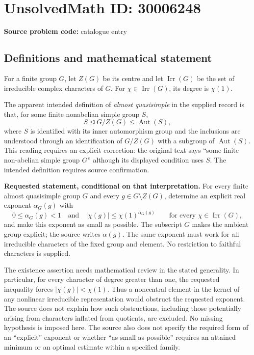 \documentclass[11pt]{article}
\begin{document}
\section*{UnsolvedMath ID: 30006248}
\textbf{Source problem code:} catalogue entry
\subsection{Definitions and mathematical statement}
For a finite group \(G\), let \(Z(G)\) be its centre and let \(\operatorname{Irr}(G)\) be the set of irreducible complex characters of \(G\). For \(\chi\in\operatorname{Irr}(G)\), its degree is \(\chi(1)\).

The apparent intended definition of \emph{almost quasisimple} in the supplied record is that, for some finite nonabelian simple group \(S\),
\[
S\trianglelefteq G/Z(G)\leq\operatorname{Aut}(S),
\]
where \(S\) is identified with its inner automorphism group and the inclusions are understood through an identification of \(G/Z(G)\) with a subgroup of \(\operatorname{Aut}(S)\). This reading requires an explicit correction: the original text says ``some finite non-abelian simple group \(G\)'' although its displayed condition uses \(S\). The intended definition requires source confirmation.

\textbf{Requested statement, conditional on that interpretation.} For every finite almost quasisimple group \(G\) and every \(g\in G\setminus Z(G)\), determine an explicit real exponent \(\alpha_G(g)\) with
\[
0\leq\alpha_G(g)<1
\quad\text{and}\quad
|\chi(g)|\leq\chi(1)^{\alpha_G(g)}
\qquad\text{for every }\chi\in\operatorname{Irr}(G),
\]
and make this exponent as small as possible. The subscript \(G\) makes the ambient group explicit; the source writes \(\alpha(g)\). The same exponent must work for all irreducible characters of the fixed group and element. No restriction to faithful characters is supplied.

The existence assertion needs mathematical review in the stated generality. In particular, for every character of degree greater than one, the requested inequality forces \(|\chi(g)|<\chi(1)\). Thus a noncentral element in the kernel of any nonlinear irreducible representation would obstruct the requested exponent. The source does not explain how such obstructions, including those potentially arising from characters inflated from quotients, are excluded. No missing hypothesis is imposed here. The source also does not specify the required form of an ``explicit'' exponent or whether ``as small as possible'' requires an attained minimum or an optimal estimate within a specified family.
\end{document}
